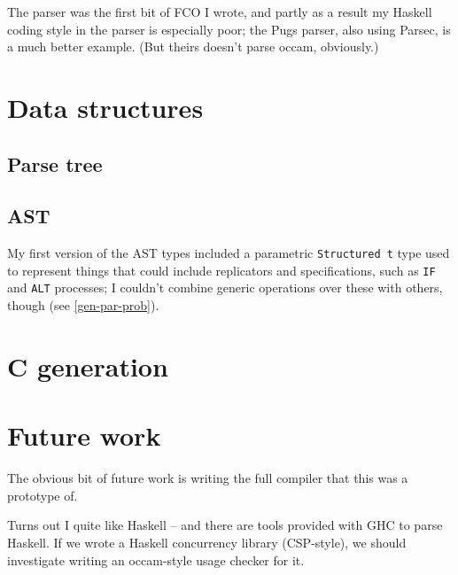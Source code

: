 \documentclass[a4paper,12pt]{article}
\def\occam{{\sffamily occam}\xspace}
\begin{document}
The parser was the first bit of FCO I wrote, and partly as a result my
Haskell coding style in the parser is especially poor; the Pugs parser,
also using Parsec, is a much better example. (But theirs doesn't parse
\occam, obviously.)

\section{Data structures}

\subsection{Parse tree}

\subsection{AST}

My first version of the AST types included a parametric
\verb|Structured t| type used to represent things that could include
replicators and specifications, such as \verb|IF| and \verb|ALT|
processes; I couldn't combine generic operations over these with others,
though (see \ref{gen-par-prob}).

\section{C generation}

\section{Future work}

The obvious bit of future work is writing the full compiler that this
was a prototype of.

Turns out I quite like Haskell -- and there are tools provided with GHC
to parse Haskell. If we wrote a Haskell concurrency library (CSP-style),
we should investigate writing an \occam-style usage checker for it.



\end{document}
